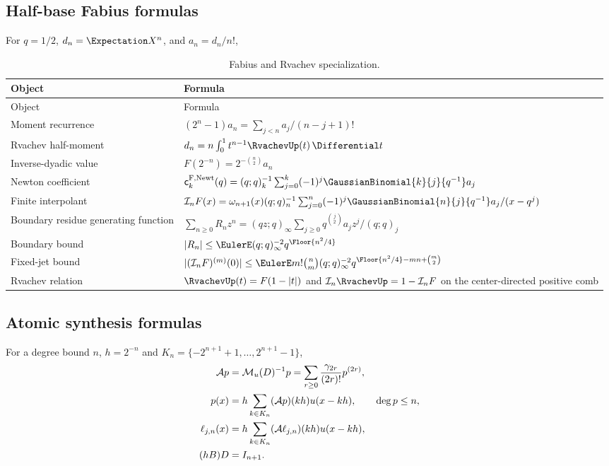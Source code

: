\subsection{Half-base Fabius formulas}

For $q=1/2$, $d_n=\Expectation X^n$, and $a_n=d_n/n!$,
\begin{longtable}{@{}p{}p{}@{}}
\caption{Fabius and Rvachev specialization.}\label{gq:tab:formula-dictionary-fabius}\\
\toprule
Object & Formula\\
\midrule
\endfirsthead
\toprule
Object & Formula\\
\midrule
\endhead
Moment recurrence
& $(2^n-1)a_n=\sum_{j<n}a_j/(n-j+1)!$\\[5pt]
Rvachev half-moment
& $d_n=n\int_0^1t^{n-1}\RvachevUp(t)\,\Differential t$\\[5pt]
Inverse-dyadic value
& $F(2^{-n})=2^{-\binom n2}a_n$\\[5pt]
Newton coefficient
& $\FabiusGeometricNewtonCoefficient{k}{q}=(q;q)_k^{-1}\sum_{j=0}^k(-1)^j
 \GaussianBinomial{k}{j}{q^{-1}}a_j$\\[6pt]
Finite interpolant
& $\Interp_nF(x)=\omega_{n+1}(x)(q;q)_n^{-1}
 \sum_{j=0}^n(-1)^j\GaussianBinomial{n}{j}{q^{-1}}a_j/(x-q^j)$\\[7pt]
Boundary residue generating function
& $\sum_{n\ge0}R_nz^n=(qz;q)_\infty
 \sum_{j\ge0}q^{\binom j2}a_jz^j/(q;q)_j$\\[7pt]
Boundary bound
& $|R_n|\le\EulerE(q;q)_\infty^{-2}q^{\Floor{n^2/4}}$\\[5pt]
Fixed-jet bound
& $|(\Interp_nF)^{(m)}(0)|\le
 \EulerE m!\binom nm(q;q)_\infty^{-2}
 q^{\Floor{n^2/4}-mn+\binom m2}$\\[7pt]
Rvachev relation
& $\RvachevUp(t)=F(1-|t|)$ and $\Interp_n\RvachevUp=1-\Interp_nF$
 on the center-directed positive comb\\
\bottomrule
\end{longtable}

\subsection{Atomic synthesis formulas}

For a degree bound $n$, $h=2^{-n}$ and
$K_n=\{-2^{n+1}+1,\ldots,2^{n+1}-1\}$,
\begin{align}
 \mathcal A p&=\mathcal M_u(D)^{-1}p
 =\sum_{r\ge0}\frac{\gamma_{2r}}{(2r)!}p^{(2r)},
 \label{gq:eq:dictionary-App}\\
 p(x)&=h\sum_{k\in K_n}(\mathcal A p)(kh)u(x-kh),
 \qquad \deg p\le n,
 \label{gq:eq:dictionary-synthesis}\\
 \ell_{j,n}(x)&=h\sum_{k\in K_n}
 (\mathcal A\ell_{j,n})(kh)u(x-kh),
 \label{gq:eq:dictionary-cardinal-synthesis}\\
 (hB)D&=I_{n+1}.
 \label{gq:eq:dictionary-right-inverse}
\end{align}

